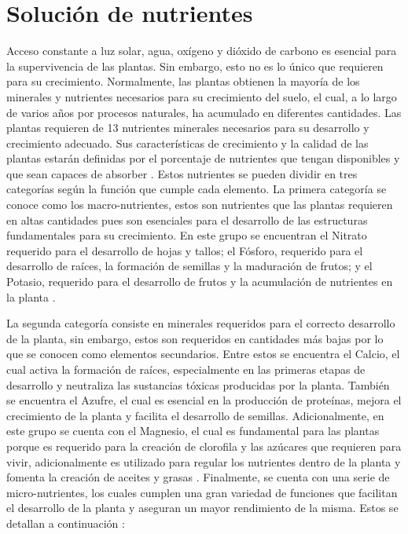 \section{Solución de nutrientes}
Acceso constante a luz solar, agua, oxígeno y dióxido de carbono es esencial para la supervivencia de las plantas. Sin embargo, esto no es lo único que requieren para su crecimiento. Normalmente, las plantas obtienen la mayoría de los minerales y nutrientes necesarios para su crecimiento del suelo, el cual, a lo largo de varios años por procesos naturales, ha acumulado en diferentes cantidades. Las plantas requieren de 13 nutrientes minerales necesarios para su desarrollo y crecimiento adecuado. Sus características de crecimiento y la calidad de las plantas estarán definidas por el porcentaje de nutrientes que tengan disponibles y que sean capaces de absorber \cite{marulanda_huerta_2003}. Estos nutrientes se pueden dividir en tres categorías según la función que cumple cada elemento. La primera categoría se conoce como los macro-nutrientes, estos son nutrientes que las plantas requieren en altas cantidades pues son esenciales para el desarrollo de las estructuras fundamentales para su crecimiento. En este grupo se encuentran el Nitrato requerido para el desarrollo de hojas y tallos; el Fósforo, requerido para el desarrollo de raíces, la formación de semillas y la maduración de frutos; y el Potasio, requerido para el desarrollo de frutos y la acumulación de nutrientes en la planta \cite{marulanda_huerta_2003}.

La segunda categoría consiste en minerales requeridos para el correcto desarrollo de la planta, sin embargo, estos son requeridos en cantidades más bajas por lo que se conocen como elementos secundarios. Entre estos se encuentra el Calcio, el cual activa la formación de raíces, especialmente en las primeras etapas de desarrollo y neutraliza las sustancias tóxicas producidas por la planta. También se encuentra el Azufre, el cual es esencial en la producción de proteínas, mejora el crecimiento de la planta y facilita el desarrollo de semillas. Adicionalmente, en este grupo se cuenta con el Magnesio, el cual es fundamental para las plantas porque es requerido para la creación de clorofila y las azúcares que requieren para vivir, adicionalmente es utilizado para regular los nutrientes dentro de la planta y fomenta la creación de aceites y grasas \cite{marulanda_huerta_2003}. Finalmente, se cuenta con una serie de micro-nutrientes, los cuales cumplen una gran variedad de funciones que facilitan el desarrollo de la planta y aseguran un mayor rendimiento de la misma. Estos se detallan a continuación \cite{atlas_scientific_nutrient_2023}:

